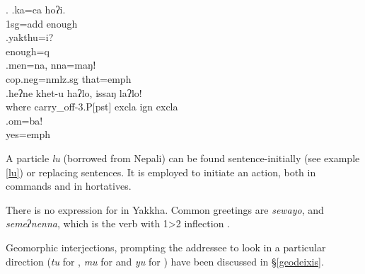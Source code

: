  \ex. \ag.ka=ca hoʔi.\\
 {\sc 1sg=add} enough\\
 \bg.yakthu=i?\\
 enough{\sc =q}\\
 \bg.men=na, nna=maŋǃ\\
 {\sc cop.neg=nmlz.sg} that{\sc =emph}\\
 \bg.heʔne khet-u haʔlo,                 issaŋ       laʔlo!\\
 where carry\_off{\sc -3.P[pst]}  {\sc excla} {\sc ign} {\sc excla}\\
  
 \bg.om=ba!\\
 yes{\sc =emph}\\
 
 
 
A particle \emph{lu} (borrowed from Nepali) can be  found sentence-initially (see example \ref{lu}) or replacing sentences. It is employed to initiate an action, both in commands and in hortatives.

 There is no expression for  in Yakkha. Common greetings are \emph{sewayo}, and \emph{semeʔnenna}, which is the verb  with 1>2 inflection . 

Geomorphic interjections, prompting the addressee to look in a particular direction (\emph{tu} for , \emph{mu} for  and \emph{yu} for ) have been  discussed in §\ref{geodeixis}.  
  

  
 

